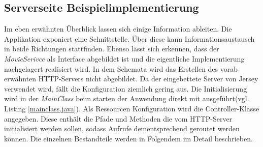 \documentclass[fleqn,10.5pt,ngerman]{SelfArx}
\begin{document}
\subsection{Serverseite Beispielimplementierung}
Im eben erwähnten Überblick lassen sich einige Information ableiten. Die Applikation exponiert eine Schnittstelle. Über diese kann Informationsaustausch in beide Richtungen stattfinden. Ebenso lässt sich erkennen, dass der \textit{MovieSerivce} als Interface abgebildet ist und die eigentliche Implementierung nachgelagert realisiert wird. In dem Schemata wird das Erstellen des vorab erwähnten HTTP-Servers nicht abgebildet. Da der eingebettete Server von Jersey verwendet wird, fällt die Konfiguration ziemlich gering aus. Die Initialisierung wird in der \textit{MainClass} beim starten der Anwendung direkt mit ausgeführt(vgl. Listing \ref{mainclass.java}). Als Ressourcen Konfiguration wird die Controller-Klasse angegeben. Diese enthält die Pfade und Methoden die vom HTTP-Server initialisiert werden sollen, sodass Aufrufe dementsprechend geroutet werden können. Die einzelnen Bestandteile werden in Folgendem im Detail beschrieben.

\end{document}
